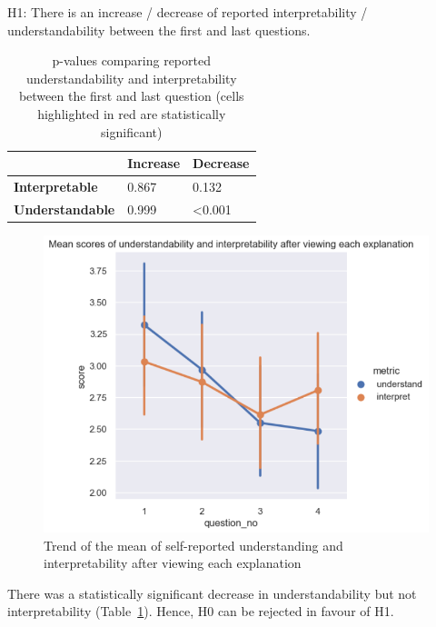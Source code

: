 H1: There is an increase / decrease of reported interpretability / understandability between the first and last questions.

\begin{table}[!ht]
  \centering
  \begin{tabular}{l|l|l|}
  \cline{2-3}
                                                & \textbf{Increase} & \textbf{Decrease} \\ \hline
  \multicolumn{1}{|l|}{\textbf{Interpretable}} & 0.867             & 0.132             \\ \hline
  \multicolumn{1}{|l|}{\textbf{Understandable}}  & 0.999             & \cellcolor{red!25}\textless{}0.001  \\ \hline
  \end{tabular}
  \caption{p-values comparing reported understandability and interpretability between the first and last question (cells highlighted in red are statistically significant)}
  \label{tab:p_values_interpret_understand}
\end{table}

\begin{figure}[!ht]
  \centering
  \includegraphics[width=1\linewidth]{figures/part3.png}
  \caption{Trend of the mean of self-reported understanding and interpretability after viewing each explanation}
  \label{fig:part3_trend}
\end{figure}

There was a statistically significant decrease in understandability but not interpretability (Table~\ref{tab:p_values_interpret_understand}). Hence, H0 can be rejected in favour of H1. 

